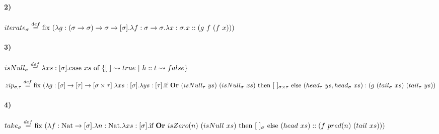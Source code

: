 \documentclass[10pt,a4paper, landscape]{article}
\begin{document}
\paragraph{2)}
$iterate_\sigma\overset{def}{=} \text{fix } (\lambda g: (\sigma\to\sigma)\to\sigma\to[\sigma] \text{.} \lambda f: \sigma\to\sigma \text{.} \lambda x: \sigma \text{.} x::(g~f~(f~x)))$

\paragraph{3)} 

$isNull_\sigma \overset{def}{=} \lambda xs: [\sigma] \text{.} \text{case } xs \text{ of } \{[~]\leadsto true~|~h::t\leadsto false\}$

\vspace*{5mm}
$zip_{\sigma,\tau}\overset{def}{=} \text{fix } (\lambda g: [\sigma]\to[\tau]\to[\sigma\times\tau] \text{.} \lambda xs: [\sigma] \text{.} \lambda ys: [\tau] \text{.} \text{if } \textbf{Or}~(isNull_\tau~ys)~(isNull_\sigma~xs) \text{ then } [~]_{\sigma\times\tau} \text{ else } (head_\tau~ys,head_\sigma~xs):(g~(tail_\sigma~xs)~(tail_\tau~ys))$

\paragraph{4)}
$take_\sigma\overset{def}{=} \text{fix } (\lambda f: \text{Nat}\to[\sigma] \text{.} \lambda n: \text{Nat} \text{.} \lambda xs: [\sigma] \text{.} \text{if } \textbf{Or}~isZero(n)~(isNull~xs) \text{ then } [~]_{\sigma} \text{ else } (head~xs)::(f~pred(n)~(tail~xs)))$
\end{document}
